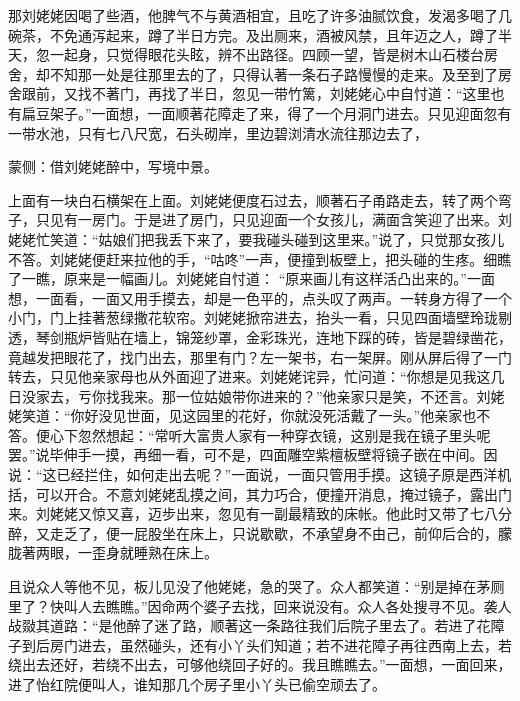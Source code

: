 \begin{parag}
    那刘姥姥因喝了些酒，他脾气不与黄酒相宜，且吃了许多油腻饮食，发渴多喝了几碗茶，不免通泻起来，蹲了半日方完。及出厕来，酒被风禁，且年迈之人，蹲了半天，忽一起身，只觉得眼花头眩，辨不出路径。四顾一望，皆是树木山石楼台房舍，却不知那一处是往那里去的了，只得认著一条石子路慢慢的走来。及至到了房舍跟前，又找不著门，再找了半日，忽见一带竹篱，刘姥姥心中自忖道：“这里也有扁豆架子。”一面想，一面顺著花障走了来，得了一个月洞门进去。只见迎面忽有一带水池，只有七八尺宽，石头砌岸，里边碧浏清水流往那边去了，\begin{note}蒙侧：借刘姥姥醉中，写境中景。\end{note}上面有一块白石横架在上面。刘姥姥便度石过去，顺著石子甬路走去，转了两个弯子，只见有一房门。于是进了房门，只见迎面一个女孩儿，满面含笑迎了出来。刘姥姥忙笑道：“姑娘们把我丢下来了，要我碰头碰到这里来。”说了，只觉那女孩儿不答。刘姥姥便赶来拉他的手，“咕咚”一声，便撞到板壁上，把头碰的生疼。细瞧了一瞧，原来是一幅画儿。刘姥姥自忖道： “原来画儿有这样活凸出来的。”一面想，一面看，一面又用手摸去，却是一色平的，点头叹了两声。一转身方得了一个小门，门上挂著葱绿撒花软帘。刘姥姥掀帘进去，抬头一看，只见四面墙壁玲珑剔透，琴剑瓶炉皆贴在墙上，锦笼纱罩，金彩珠光，连地下踩的砖，皆是碧绿凿花，竟越发把眼花了，找门出去，那里有门？左一架书，右一架屏。刚从屏后得了一门转去，只见他亲家母也从外面迎了进来。刘姥姥诧异，忙问道：“你想是见我这几日没家去，亏你找我来。那一位姑娘带你进来的？”他亲家只是笑，不还言。刘姥姥笑道：“你好没见世面，见这园里的花好，你就没死活戴了一头。”他亲家也不答。便心下忽然想起：“常听大富贵人家有一种穿衣镜，这别是我在镜子里头呢罢。”说毕伸手一摸，再细一看，可不是，四面雕空紫檀板壁将镜子嵌在中间。因说：“这已经拦住，如何走出去呢？”一面说，一面只管用手摸。这镜子原是西洋机括，可以开合。不意刘姥姥乱摸之间，其力巧合，便撞开消息，掩过镜子，露出门来。刘姥姥又惊又喜，迈步出来，忽见有一副最精致的床帐。他此时又带了七八分醉，又走乏了，便一屁股坐在床上，只说歇歇，不承望身不由己，前仰后合的，朦胧著两眼，一歪身就睡熟在床上。
\end{parag}


\begin{parag}
    且说众人等他不见，板儿见没了他姥姥，急的哭了。众人都笑道：“别是掉在茅厕里了？快叫人去瞧瞧。”因命两个婆子去找，回来说没有。众人各处搜寻不见。袭人敁敠其道路：“是他醉了迷了路，顺著这一条路往我们后院子里去了。若进了花障子到后房门进去，虽然碰头，还有小丫头们知道；若不进花障子再往西南上去，若绕出去还好，若绕不出去，可够他绕回子好的。我且瞧瞧去。”一面想，一面回来，进了怡红院便叫人，谁知那几个房子里小丫头已偷空顽去了。
\end{parag}


